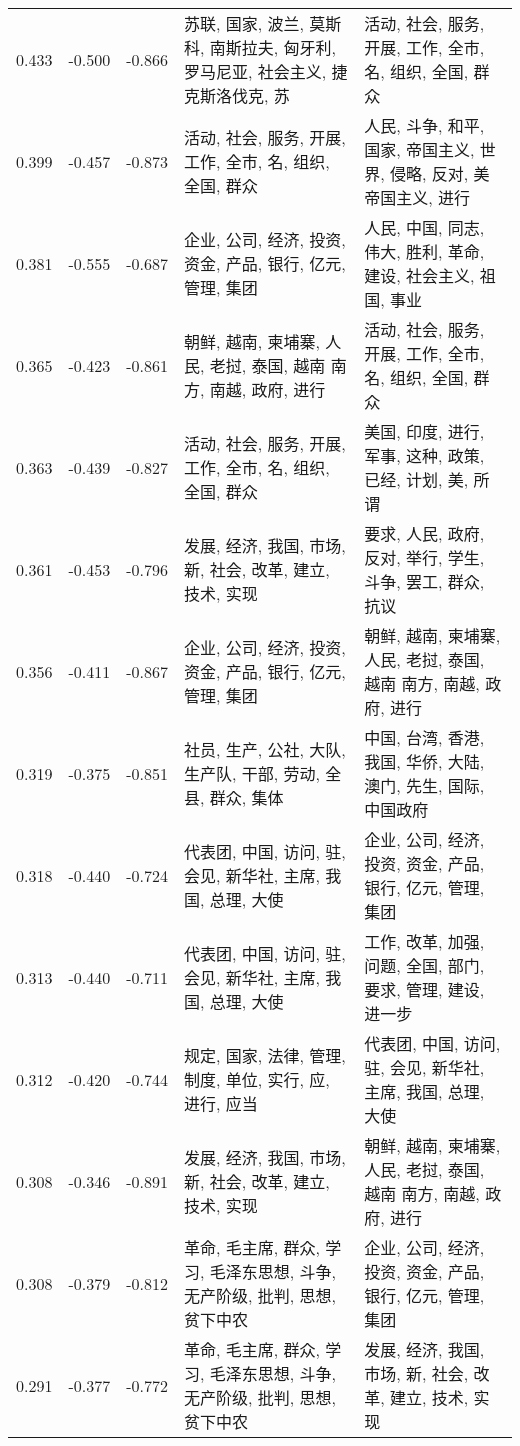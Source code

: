 \begin{tabular}{cccp{5cm}p{5cm}}
0.433 & -0.500 & -0.866 & 苏联, 国家, 波兰, 莫斯科, 南斯拉夫, 匈牙利, 罗马尼亚, 社会主义, 捷克斯洛伐克, 苏 & 活动, 社会, 服务, 开展, 工作, 全市, 名, 组织, 全国, 群众 \\
0.399 & -0.457 & -0.873 & 活动, 社会, 服务, 开展, 工作, 全市, 名, 组织, 全国, 群众 & 人民, 斗争, 和平, 国家, 帝国主义, 世界, 侵略, 反对, 美帝国主义, 进行 \\
0.381 & -0.555 & -0.687 & 企业, 公司, 经济, 投资, 资金, 产品, 银行, 亿元, 管理, 集团 & 人民, 中国, 同志, 伟大, 胜利, 革命, 建设, 社会主义, 祖国, 事业 \\
0.365 & -0.423 & -0.861 & 朝鲜, 越南, 柬埔寨, 人民, 老挝, 泰国, 越南 南方, 南越, 政府, 进行 & 活动, 社会, 服务, 开展, 工作, 全市, 名, 组织, 全国, 群众 \\
0.363 & -0.439 & -0.827 & 活动, 社会, 服务, 开展, 工作, 全市, 名, 组织, 全国, 群众 & 美国, 印度, 进行, 军事, 这种, 政策, 已经, 计划, 美, 所谓 \\
0.361 & -0.453 & -0.796 & 发展, 经济, 我国, 市场, 新, 社会, 改革, 建立, 技术, 实现 & 要求, 人民, 政府, 反对, 举行, 学生, 斗争, 罢工, 群众, 抗议 \\
0.356 & -0.411 & -0.867 & 企业, 公司, 经济, 投资, 资金, 产品, 银行, 亿元, 管理, 集团 & 朝鲜, 越南, 柬埔寨, 人民, 老挝, 泰国, 越南 南方, 南越, 政府, 进行 \\
0.319 & -0.375 & -0.851 & 社员, 生产, 公社, 大队, 生产队, 干部, 劳动, 全县, 群众, 集体 & 中国, 台湾, 香港, 我国, 华侨, 大陆, 澳门, 先生, 国际, 中国政府 \\
0.318 & -0.440 & -0.724 & 代表团, 中国, 访问, 驻, 会见, 新华社, 主席, 我国, 总理, 大使 & 企业, 公司, 经济, 投资, 资金, 产品, 银行, 亿元, 管理, 集团 \\
0.313 & -0.440 & -0.711 & 代表团, 中国, 访问, 驻, 会见, 新华社, 主席, 我国, 总理, 大使 & 工作, 改革, 加强, 问题, 全国, 部门, 要求, 管理, 建设, 进一步 \\
0.312 & -0.420 & -0.744 & 规定, 国家, 法律, 管理, 制度, 单位, 实行, 应, 进行, 应当 & 代表团, 中国, 访问, 驻, 会见, 新华社, 主席, 我国, 总理, 大使 \\
0.308 & -0.346 & -0.891 & 发展, 经济, 我国, 市场, 新, 社会, 改革, 建立, 技术, 实现 & 朝鲜, 越南, 柬埔寨, 人民, 老挝, 泰国, 越南 南方, 南越, 政府, 进行 \\
0.308 & -0.379 & -0.812 & 革命, 毛主席, 群众, 学习, 毛泽东思想, 斗争, 无产阶级, 批判, 思想, 贫下中农 & 企业, 公司, 经济, 投资, 资金, 产品, 银行, 亿元, 管理, 集团 \\
0.291 & -0.377 & -0.772 & 革命, 毛主席, 群众, 学习, 毛泽东思想, 斗争, 无产阶级, 批判, 思想, 贫下中农 & 发展, 经济, 我国, 市场, 新, 社会, 改革, 建立, 技术, 实现 \\

\end{tabular}
